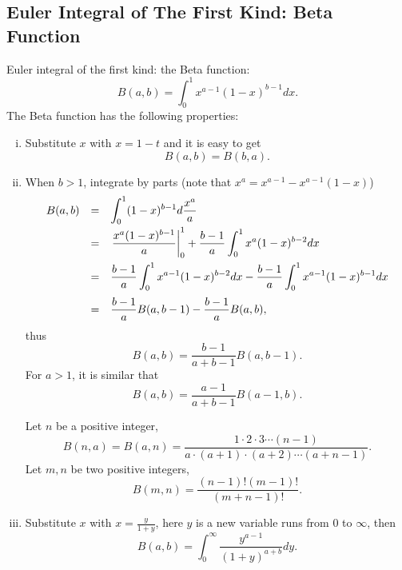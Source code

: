 \documentclass{book}
\numberwithin{equation}{section}
\begin{document}
\subsection{Euler Integral of The First Kind: Beta Function}
Euler integral of the first kind: the Beta function:
\begin{equation}
  B(a,b)=\int_0^1x^{a-1}(1-x)^{b-1}dx.
\end{equation}
The Beta function has the following properties:
\begin{enumerate}[(i)]
\item Substitute $x$ with $x=1-t$ and it is easy to get
  \begin{equation}
    B(a,b)=B(b,a).
  \end{equation}

\item When $b>1$, integrate by parts (note that $x^a=x^{a-1}-x^{a-1}(1-x)$)
  \begin{equation}
    \begin{array}{rcl}
      B(a,b) &=& \displaystyle\int_0^1(1-x)^{b-1}d\frac{x^a}{a}\\\vbox to 20pt{}
      &=& \displaystyle\left.\frac{x^a(1-x)^{b-1}}{a}\right|_0^1
      +\frac{b-1}{a}\int_0^1x^a(1-x)^{b-2}dx\\\vbox to 20pt{}
      &=& \displaystyle\frac{b-1}{a}\int_0^1x^{a-1}(1-x)^{b-2}dx-
      \frac{b-1}{a}\int_0^1x^{a-1}(1-x)^{b-1}dx\\\vbox to 20pt{}
      &=&\displaystyle\frac{b-1}{a}B(a,b-1)-\frac{b-1}{a}B(a,b),
    \end{array}
  \end{equation}
  thus
  \begin{equation}
    B(a,b)=\frac{b-1}{a+b-1}B(a,b-1).
  \end{equation}
  For $a>1$, it is similar that
  \begin{equation}
    B(a,b)=\frac{a-1}{a+b-1}B(a-1,b).
  \end{equation}

  Let $n$ be a positive integer, 
  \begin{equation}
    B(n,a)=B(a,n)=\frac{1\cdot2\cdot3\cdots(n-1)}{a\cdot(a+1)\cdot(a+2)\cdots
      (a+n-1)}.
  \end{equation}
  Let $m,n$ be two positive integers,
  \begin{equation}
    B(m,n)=\frac{(n-1)!(m-1)!}{(m+n-1)!}.
  \end{equation}

\item Substitute $x$ with $x=\frac{y}{1+y}$, here $y$ is a new
  variable runs from $0$ to $\infty$, then
  \begin{equation}
    B(a,b)=\int_0^\infty\frac{y^{a-1}}{(1+y)^{a+b}}dy.
  \end{equation}


\end{enumerate}
\end{document}
